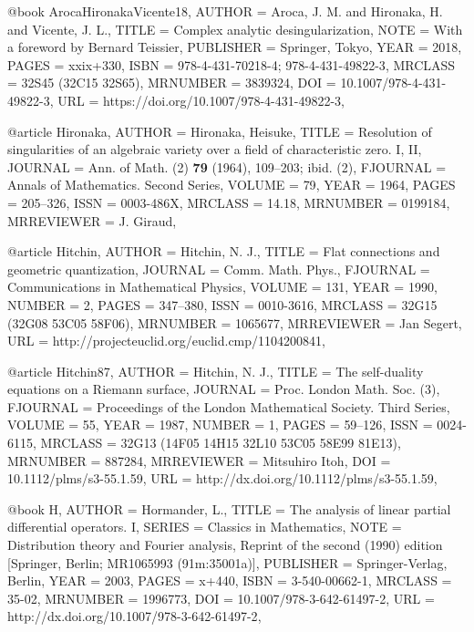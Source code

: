 @book {ArocaHironakaVicente18,
    AUTHOR = {Aroca, J. M. and Hironaka, H. and Vicente, J.
              L.},
     TITLE = {Complex analytic desingularization},
      NOTE = {With a foreword by Bernard Teissier},
 PUBLISHER = {Springer, Tokyo},
      YEAR = {2018},
     PAGES = {xxix+330},
      ISBN = {978-4-431-70218-4; 978-4-431-49822-3},
   MRCLASS = {32S45 (32C15 32S65)},
  MRNUMBER = {3839324},
       DOI = {10.1007/978-4-431-49822-3},
       URL = {https://doi.org/10.1007/978-4-431-49822-3},
}


@article {Hironaka,
    AUTHOR = {Hironaka, Heisuke},
     TITLE = {Resolution of singularities of an algebraic variety over a
              field of characteristic zero. {I}, {II}},
   JOURNAL = {Ann. of Math. (2) {\textbf{79}} (1964), 109--203; ibid. (2)},
  FJOURNAL = {Annals of Mathematics. Second Series},
    VOLUME = {79},
      YEAR = {1964},
     PAGES = {205--326},
      ISSN = {0003-486X},
   MRCLASS = {14.18},
  MRNUMBER = {0199184},
MRREVIEWER = {J. Giraud},
}

@article {Hitchin,
    AUTHOR = {Hitchin, N. J.},
     TITLE = {Flat connections and geometric quantization},
   JOURNAL = {Comm. Math. Phys.},
  FJOURNAL = {Communications in Mathematical Physics},
    VOLUME = {131},
      YEAR = {1990},
    NUMBER = {2},
     PAGES = {347--380},
      ISSN = {0010-3616},
   MRCLASS = {32G15 (32G08 53C05 58F06)},
  MRNUMBER = {1065677},
MRREVIEWER = {Jan Segert},
       URL = {http://projecteuclid.org/euclid.cmp/1104200841},
}

@article {Hitchin87,
    AUTHOR = {Hitchin, N. J.},
     TITLE = {The self-duality equations on a {R}iemann surface},
   JOURNAL = {Proc. London Math. Soc. (3)},
  FJOURNAL = {Proceedings of the London Mathematical Society. Third Series},
    VOLUME = {55},
      YEAR = {1987},
    NUMBER = {1},
     PAGES = {59--126},
      ISSN = {0024-6115},
   MRCLASS = {32G13 (14F05 14H15 32L10 53C05 58E99 81E13)},
  MRNUMBER = {887284},
MRREVIEWER = {Mitsuhiro Itoh},
       DOI = {10.1112/plms/s3-55.1.59},
       URL = {http://dx.doi.org/10.1112/plms/s3-55.1.59},
}

@book {H,
    AUTHOR = {Hormander, L.},
     TITLE = {The analysis of linear partial differential operators. {I}},
    SERIES = {Classics in Mathematics},
      NOTE = {Distribution theory and Fourier analysis,
              Reprint of the second (1990) edition [Springer, Berlin;
              MR1065993 (91m:35001a)]},
 PUBLISHER = {Springer-Verlag, Berlin},
      YEAR = {2003},
     PAGES = {x+440},
      ISBN = {3-540-00662-1},
   MRCLASS = {35-02},
  MRNUMBER = {1996773},
       DOI = {10.1007/978-3-642-61497-2},
       URL = {http://dx.doi.org/10.1007/978-3-642-61497-2},
}

